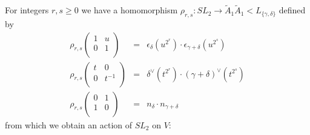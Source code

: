 For integers $r,s\geq 0$ we have a homomorphism $\rho_{r,s}:SL_2\rightarrow \widetilde{A}_1\widetilde{A}_1 < L_{\{\gamma,\delta\}}$ defined by
\begin{eqnarray*}
\rho_{r,s}   \left(\begin{matrix} %
      1 & u \\
      0 & 1 \\
   \end{matrix}\right) &=& \epsilon_\delta(u^{2^r})\cdot\epsilon_{\gamma+\delta}(u^{2^s}) \\
\rho_{r,s}   \left(\begin{matrix} %
      t & 0 \\
      0 & t^{-1} \\
   \end{matrix}\right) &=& \delta^\vee(t^{2^r})\cdot(\gamma+\delta)^\vee(t^{2^s}) \\
\rho_{r,s}   \left(\begin{matrix} %
      0 & 1 \\
      1 & 0 \\
   \end{matrix}\right) &=& n_\delta\cdot n_{\gamma+\delta} 
\end{eqnarray*}
from which we obtain an action of $SL_2$ on $V$:
